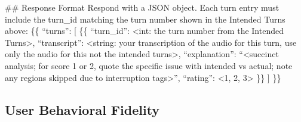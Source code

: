\begin{tcolorbox}[promptbox, title={\small User Speech Fidelity Prompt}]
        \#\# Response Format\newline
        Respond with a JSON object. Each turn entry must include the turn\_id matching the turn number shown in the Intended Turns above:\newline
        \{\{\newline
          ``turns'': [\newline
            \{\{\newline
              ``turn\_id'': \textless{}int: the turn number from the Intended Turns\textgreater{},\newline
              ``transcript'': \textless{}string: your transcription of the audio for this turn, use only the audio for this not the intended turns\textgreater{},\newline
              ``explanation'': ``\textless{}succinct analysis; for score 1 or 2, quote the specific issue with intended vs actual; note any regions skipped due to interruption tags\textgreater{}'',\newline
              ``rating'': \textless{}1, 2, 3\textgreater{}\newline
            \}\}\newline
          ]\newline
        \}\}
\end{tcolorbox}

\subsection{User Behavioral Fidelity}
\label{app:prompt-user-behavior}

